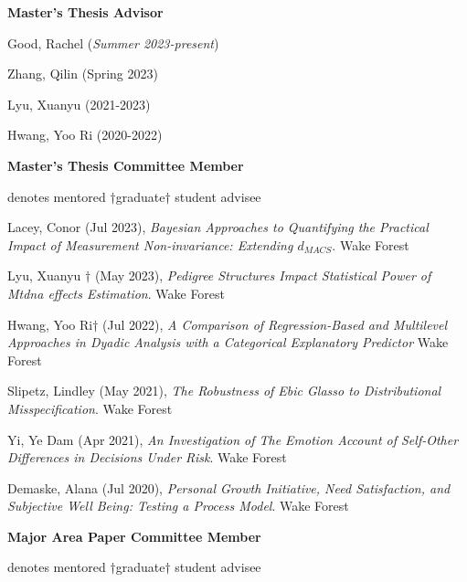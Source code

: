 {\large\textbf{Master's Thesis Advisor}}
\begin{etaremune}%
\item Good, Rachel  (\textit{Summer 2023-present})
\item Zhang, Qilin  (Spring 2023)
\item Lyu, Xuanyu  (2021-2023)
\item Hwang, Yoo Ri (2020-2022)
\end{etaremune}%

{\large\textbf{Master's Thesis Committee Member}}
\vspace{-1mm}\begin{center}\footnotesize{denotes mentored $\dagger$graduate$\dagger$ student advisee}\end{center}\vspace{-2mm}
\begin{etaremune}%
\item Lacey, Conor (Jul 2023), \textit{Bayesian Approaches to Quantifying the Practical Impact of Measurement Non-invariance: Extending $d_{MACS}$}.  Wake Forest%
\item Lyu, Xuanyu $\dagger$ (May 2023), \textit{Pedigree Structures Impact Statistical Power of Mtdna effects Estimation}.  Wake Forest%
\item Hwang, Yoo Ri$\dagger$ (Jul 2022), \textit{A Comparison of Regression-Based and Multilevel Approaches in Dyadic Analysis with a Categorical Explanatory Predictor } Wake Forest%
\item  Slipetz, Lindley (May 2021), \textit{The Robustness of Ebic Glasso to Distributional Misspecification}. Wake Forest
\item Yi, Ye Dam (Apr 2021), \textit{An Investigation of The Emotion Account of Self-Other Differences in Decisions Under Risk}. Wake Forest
\item Demaske, Alana (Jul 2020), \textit{Personal Growth Initiative, Need Satisfaction, and Subjective Well Being: Testing a Process Model}. Wake Forest%
\end{etaremune}%
%
{\large\textbf{Major Area Paper Committee Member}}
\vspace{-1mm}\begin{center}\footnotesize{denotes mentored $\dagger$graduate$\dagger$ student advisee}\end{center}\vspace{-2mm}
